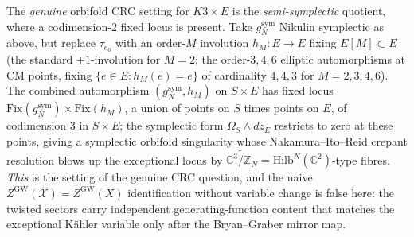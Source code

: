 \begin{remark}
The \emph{genuine} orbifold CRC setting for $K3\times E$ is the
\emph{semi-symplectic} quotient, where a codimension-$2$ fixed locus
is present. Take $g_N^{\mathrm{sym}}$ Nikulin symplectic as above, but
replace $\tau_{e_0}$ with an order-$M$ involution $h_M:E\to E$ fixing
$E[M]\subset E$ (the standard $\pm 1$-involution for $M=2$; the
order-$3,4,6$ elliptic automorphisms at CM points, fixing
$\{e\in E: h_M(e)=e\}$ of cardinality $4,4,3$ for $M=2,3,4,6$). The
combined automorphism $(g_N^{\mathrm{sym}},h_M)$ on $S\times E$ has
fixed locus $\mathrm{Fix}(g_N^{\mathrm{sym}})\times\mathrm{Fix}(h_M)$,
a union of points on $S$ times points on $E$, of codimension $3$ in
$S\times E$; the symplectic form $\Omega_S\wedge dz_E$ restricts to
zero at these points, giving a symplectic orbifold singularity whose
Nakamura--Ito--Reid crepant resolution blows up the exceptional locus
by $\widetilde{\mathbb C^3/\mathbb Z_N}=\mathrm{Hilb}^N(\mathbb C^2)$-type
fibres. \emph{This} is the setting of the genuine CRC question, and
the naive $Z^{\mathrm{GW}}(\mathcal X)=Z^{\mathrm{GW}}(X)$ identification
without variable change is false here: the twisted sectors carry
independent generating-function content that matches the exceptional
K\"ahler variable only after the Bryan--Graber mirror map.


\end{remark}
